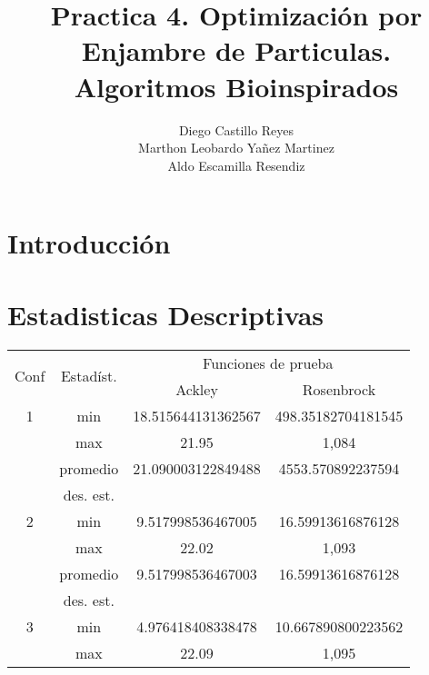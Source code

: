 \documentclass{report}
\title{\Huge{\textbf{Practica 4. Optimización por Enjambre de Particulas.}}\\
\Large{\textbf{Algoritmos Bioinspirados}}}
\author{Diego Castillo Reyes\\Marthon Leobardo Yañez Martinez\\Aldo Escamilla Resendiz}
\begin{document}
    \maketitle
    \tableofcontents
    \newpage
    \section{Introducción}


    \section{Estadisticas Descriptivas}
    \begin{table}[ht]
        \centering
        \begin{tabular}{|c|c|c|c|}
        \hline
        \multirow{2}{*}{Conf} & \multirow{2}{*}{Estadíst.} & \multicolumn{2}{c|}{Funciones de prueba} \\ \cline{3-4} 
                              &                             & Ackley & Rosenbrock \\ \hline
        1                     & min                         & 18.515644131362567 & 498.35182704181545 \\ \cline{2-4} 
                              & max                         &     21.95       &    1,084   \\ \cline{2-4} 
                              & promedio                    &      21.090003122849488      &    4553.570892237594    \\ \cline{2-4} 
                              & des. est.                   &            &        \\ \hline
        2                     & min                         &     9.517998536467005   & 16.59913616876128    \\ \cline{2-4}
                              & max                         &  22.02   &    1,093    \\ \cline{2-4}
                              & promedio                    &    9.517998536467003    &  16.59913616876128   \\ \cline{2-4}
                              & des. est.                   &            &        \\ \hline
        3                     & min                         &      4.976418408338478      &     10.667890800223562   \\ \cline{2-4} 
                              & max                         &     22.09       &     1,095   \\ \cline{2-4} 

\end{tabular}
\end{table}
\end{document}
